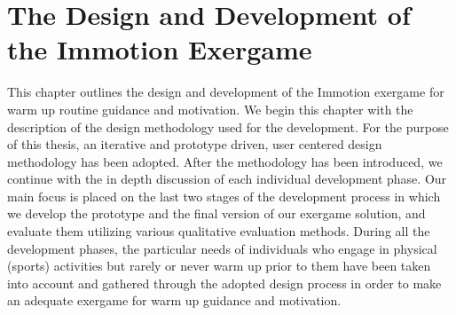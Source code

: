 \chapter{The Design and Development of the Immotion Exergame}\label{chapter:implementation}

This chapter outlines the design and development of the Immotion exergame for warm up routine guidance and motivation. We begin this chapter with the description of the design methodology used for the development. For the purpose of this thesis, an iterative and prototype driven, user centered design methodology has been adopted. After the methodology has been introduced, we continue with the in depth discussion of each individual development phase. Our main focus is placed on the last two stages of the development process in which we develop the prototype and the final version of our exergame solution, and evaluate them utilizing various qualitative evaluation methods. During all the development phases, the particular needs of individuals who engage in physical (sports) activities but rarely or never warm up prior to them have been taken into account and gathered through the adopted design process in order to make an adequate exergame for warm up guidance and motivation. %

